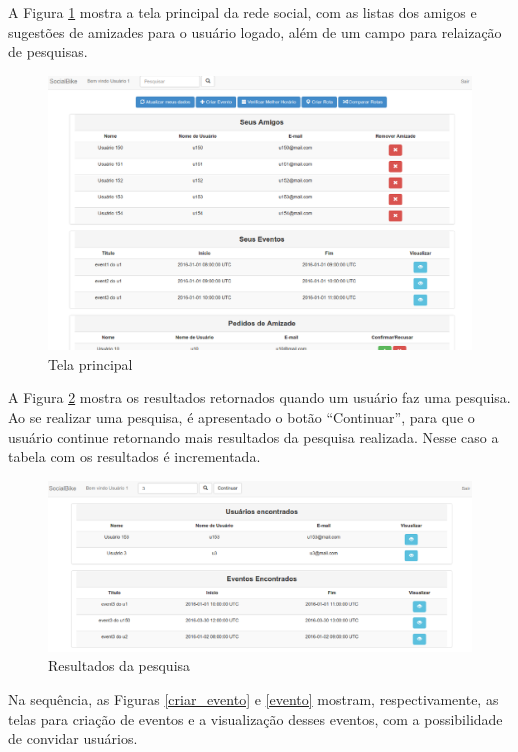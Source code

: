 A Figura \ref{home} mostra a tela principal da rede social, com as listas dos amigos e sugestões de amizades para o usuário logado, além de um campo para relaização de pesquisas.

\newpage
\begin{figure}[!h]
	\centering
	\includegraphics[scale=0.45]{figuras/resultados/home.eps}
	\caption[Tela principal]{Tela principal}
	\label{home}
\end{figure}

A Figura \ref{pesquisa} mostra os resultados retornados quando um usuário faz uma pesquisa. Ao se realizar uma pesquisa, é apresentado o botão ``Continuar'', para que o usuário continue retornando mais resultados da pesquisa realizada. Nesse caso a tabela com os resultados é incrementada.

\begin{figure}[!h]
	\centering
	\includegraphics[scale=0.45]{figuras/resultados/pesquisa.eps}
	\caption[Resultados da pesquisa]{Resultados da pesquisa}
	\label{pesquisa}
\end{figure}

Na sequência, as Figuras \ref{criar_evento} e \ref{evento} mostram, respectivamente, as telas para criação de eventos e a visualização desses eventos, com a possibilidade de convidar usuários.


